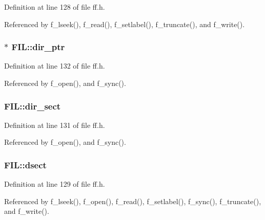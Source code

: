 Definition at line 128 of file ff.\+h.



Referenced by f\+\_\+lseek(), f\+\_\+read(), f\+\_\+setlabel(), f\+\_\+truncate(), and f\+\_\+write().

\subsubsection[{\texorpdfstring{dir\+\_\+ptr}{dir_ptr}}]{$\ast$ F\+I\+L\+::dir\+\_\+ptr}\hypertarget{structFIL_a5af9e9fb312b629220eaf684dd28c4a9}{}\label{structFIL_a5af9e9fb312b629220eaf684dd28c4a9}


Definition at line 132 of file ff.\+h.



Referenced by f\+\_\+open(), and f\+\_\+sync().

\subsubsection[{\texorpdfstring{dir\+\_\+sect}{dir_sect}}]{ F\+I\+L\+::dir\+\_\+sect}\hypertarget{structFIL_ab203794f939ad4480e81dfa488770783}{}\label{structFIL_ab203794f939ad4480e81dfa488770783}


Definition at line 131 of file ff.\+h.



Referenced by f\+\_\+open(), and f\+\_\+sync().

\subsubsection[{\texorpdfstring{dsect}{dsect}}]{ F\+I\+L\+::dsect}\hypertarget{structFIL_ab3d4165d6fd32ac71a130d835fbf0b4d}{}\label{structFIL_ab3d4165d6fd32ac71a130d835fbf0b4d}


Definition at line 129 of file ff.\+h.



Referenced by f\+\_\+lseek(), f\+\_\+open(), f\+\_\+read(), f\+\_\+setlabel(), f\+\_\+sync(), f\+\_\+truncate(), and f\+\_\+write().

